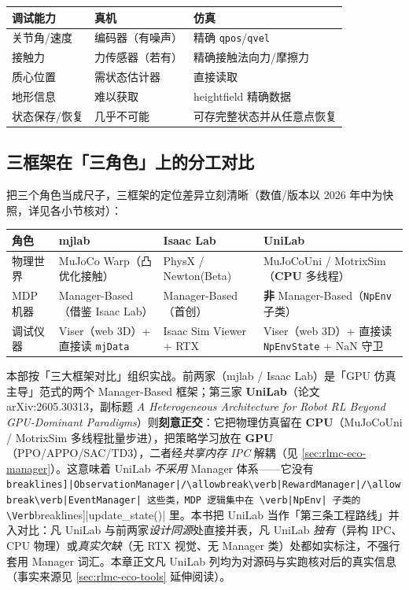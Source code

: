 \begin{center}
\small
\begin{tabular}{@{}lll@{}}
\toprule
调试能力 & 真机 & 仿真 \\
\midrule
关节角/速度 & 编码器（有噪声） & 精确 \verb|qpos|/\allowbreak\verb|qvel| \\
接触力 & 力传感器（若有） & 精确接触法向力/摩擦力 \\
质心位置 & 需状态估计器 & 直接读取 \\
地形信息 & 难以获取 & heightfield 精确数据 \\
状态保存/恢复 & 几乎不可能 & 可存完整状态并从任意点恢复 \\
\bottomrule
\end{tabular}
\end{center}

\subsection{三框架在「三角色」上的分工对比}

把三个角色当成尺子，三框架的定位差异立刻清晰（数值/版本以 2026 年中为快照，详见各小节核对）：

\begin{center}
\small
\begin{tabularx}{\linewidth}{@{}lLLL@{}}
\toprule
角色 & mjlab & Isaac Lab & UniLab \\
\midrule
物理世界 & MuJoCo Warp（凸优化接触） & PhysX / Newton(Beta) & MuJoCoUni / MotrixSim（\textbf{CPU} 多线程） \\
MDP 机器 & Manager-Based（借鉴 Isaac Lab） & Manager-Based（首创） & \textbf{非} Manager-Based（\verb|NpEnv| 子类） \\
调试仪器 & Viser（web 3D）+ 直接读 \verb|mjData| & Isaac Sim Viewer + RTX & Viser（web 3D）+ 直接读 \verb|NpEnvState| + NaN 守卫 \\
\bottomrule
\end{tabularx}
\end{center}

\begin{note}
本部按「三大框架对比」组织实战。前两家（mjlab / Isaac Lab）是「GPU 仿真主导」范式的两个 Manager-Based 框架；第三家 \textbf{UniLab}（论文 arXiv:2605.30313，副标题 \emph{A Heterogeneous Architecture for Robot RL Beyond GPU-Dominant Paradigms}）则\textbf{刻意正交}：它把物理仿真留在 \textbf{CPU}（MuJoCoUni / MotrixSim 多线程批量步进），把策略学习放在 \textbf{GPU}（PPO/APPO/SAC/TD3），二者经\emph{共享内存 IPC} 解耦（见 \cref{sec:rlmc-eco-manager}）。这意味着 UniLab \emph{不采用} Manager 体系——它没有 \Verb[breaklines]|ObservationManager|/\allowbreak\verb|RewardManager|/\allowbreak\verb|EventManager| 这些类，MDP 逻辑集中在 \verb|NpEnv| 子类的 \Verb[breaklines]|update_state()| 里。本书把 UniLab 当作「第三条工程路线」并入对比：凡 UniLab 与前两家\emph{设计同源}处直接并表，凡 UniLab \emph{独有}（异构 IPC、CPU 物理）或\emph{真实欠缺}（无 RTX 视觉、无 Manager 类）处都如实标注，不强行套用 Manager 词汇。本章正文凡 UniLab 列均为对源码与实跑核对后的真实信息（事实来源见 \cref{sec:rlmc-eco-tools} 延伸阅读）。
\end{note}


